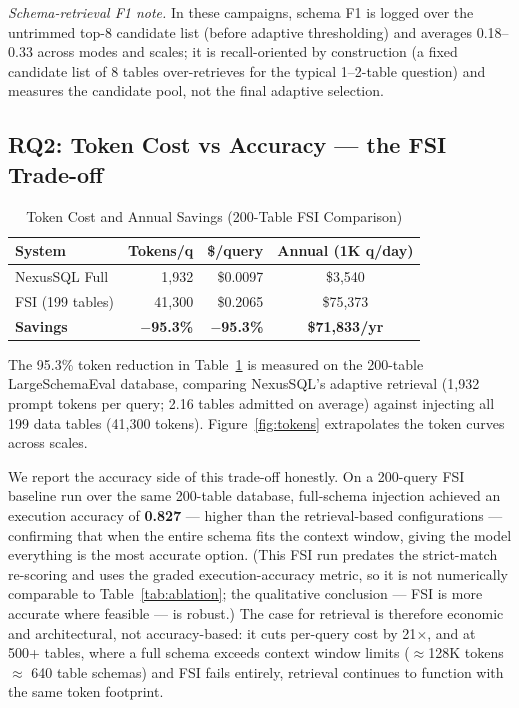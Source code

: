 \documentclass[conference]{IEEEtran}
\begin{document}
\textit{Schema-retrieval F1 note.} In these campaigns, schema F1 is
logged over the untrimmed top-8 candidate list (before adaptive
thresholding) and averages 0.18--0.33 across modes and scales; it is
recall-oriented by construction (a fixed candidate list of 8 tables
over-retrieves for the typical 1--2-table question) and measures the
candidate pool, not the final adaptive selection.

\subsection{RQ2: Token Cost vs Accuracy --- the FSI Trade-off}
\label{sec:rq_tokens}

\begin{table}[!htb]
\caption{Token Cost and Annual Savings (200-Table FSI Comparison)}
\label{tab:tokens}
\centering
\small
\begin{tabular}{lrrc}
\toprule
\textbf{System} & \textbf{Tokens/q} & \textbf{\$/query} & \textbf{Annual (1K q/day)} \\
\midrule
NexusSQL Full          & 1,932  & \$0.0097  & \$3,540 \\
FSI (199 tables)      & 41,300 & \$0.2065  & \$75,373 \\
\midrule
\textbf{Savings} & \textbf{$-$95.3\%} & \textbf{$-$95.3\%} & \textbf{\$71,833/yr} \\
\bottomrule
\end{tabular}
\end{table}

The 95.3\% token reduction in Table~\ref{tab:tokens} is measured on the
200-table LargeSchemaEval database, comparing NexusSQL's adaptive
retrieval (1,932 prompt tokens per query; 2.16 tables admitted on
average) against injecting all 199 data tables (41,300 tokens).
Figure~\ref{fig:tokens} extrapolates the token curves across scales.

We report the accuracy side of this trade-off honestly. On a 200-query
FSI baseline run over the same 200-table database, full-schema
injection achieved an execution accuracy of \textbf{0.827} --- higher
than the retrieval-based configurations --- confirming that when the
entire schema fits the context window, giving the model everything is
the most accurate option. (This FSI run predates the strict-match
re-scoring and uses the graded execution-accuracy metric, so it is not
numerically comparable to Table~\ref{tab:ablation}; the qualitative
conclusion --- FSI is more accurate where feasible --- is robust.)
The case for retrieval is therefore economic and architectural, not
accuracy-based: it cuts per-query cost by 21$\times$, and at 500+
tables, where a full schema exceeds context window limits
($\approx$128K tokens $\approx$ 640 table schemas) and FSI fails
entirely, retrieval continues to function with the same token
footprint.
\end{document}
